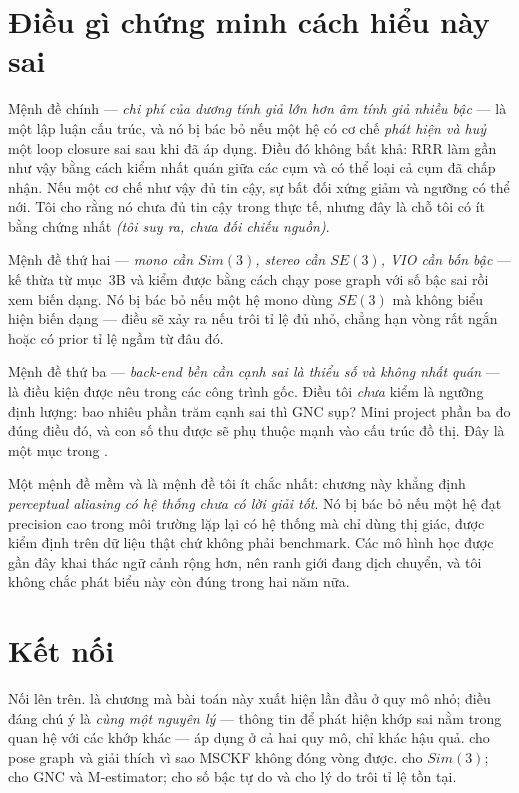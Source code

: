 \documentclass[../../vslam.tex]{subfiles}
\begin{document}
\section{Điều gì chứng minh cách hiểu này sai}

Mệnh đề chính --- \emph{chi phí của dương tính giả lớn hơn âm tính giả nhiều bậc} --- là một lập luận cấu trúc, và nó bị bác bỏ nếu một hệ có cơ chế \emph{phát hiện và huỷ} một loop closure sai sau khi đã áp dụng. Điều đó không bất khả: RRR \cite{latif2013rrr} làm gần như vậy bằng cách kiểm nhất quán giữa các cụm và có thể loại cả cụm đã chấp nhận. Nếu một cơ chế như vậy đủ tin cậy, sự bất đối xứng giảm và ngưỡng có thể nới. Tôi cho rằng nó chưa đủ tin cậy trong thực tế, nhưng đây là chỗ tôi có ít bằng chứng nhất \emph{(tôi suy ra, chưa đối chiếu nguồn)}.

Mệnh đề thứ hai --- \emph{mono cần \(Sim(3)\), stereo cần \(SE(3)\), VIO cần bốn bậc} --- kế thừa từ  mục~3B và kiểm được bằng cách chạy pose graph với số bậc sai rồi xem biến dạng. Nó bị bác bỏ nếu một hệ mono dùng \(SE(3)\) mà không biểu hiện biến dạng --- điều sẽ xảy ra nếu trôi tỉ lệ đủ nhỏ, chẳng hạn vòng rất ngắn hoặc có prior tỉ lệ ngầm từ đâu đó.

Mệnh đề thứ ba --- \emph{back-end bền cần cạnh sai là thiểu số và không nhất quán} --- là điều kiện được nêu trong các công trình gốc. Điều tôi \emph{chưa} kiểm là ngưỡng định lượng: bao nhiêu phần trăm cạnh sai thì GNC sụp? Mini project phần ba đo đúng điều đó, và con số thu được sẽ phụ thuộc mạnh vào cấu trúc đồ thị. Đây là một mục trong .

Một mệnh đề mềm và là mệnh đề tôi ít chắc nhất: chương này khẳng định \emph{perceptual aliasing có hệ thống chưa có lời giải tốt}. Nó bị bác bỏ nếu một hệ đạt precision cao trong môi trường lặp lại có hệ thống mà chỉ dùng thị giác, được kiểm định trên dữ liệu thật chứ không phải benchmark. Các mô hình học được gần đây khai thác ngữ cảnh rộng hơn, nên ranh giới đang dịch chuyển, và tôi không chắc phát biểu này còn đúng trong hai năm nữa.

\section{Kết nối}

Nối lên trên.  là chương mà bài toán này xuất hiện lần đầu ở quy mô nhỏ; điều đáng chú ý là \emph{cùng một nguyên lý} --- thông tin để phát hiện khớp sai nằm trong quan hệ với các khớp khác --- áp dụng ở cả hai quy mô, chỉ khác hậu quả.  cho pose graph và giải thích vì sao MSCKF không đóng vòng được.  cho \(Sim(3)\);  cho GNC và M-estimator;  cho số bậc tự do và cho lý do trôi tỉ lệ tồn tại.
\end{document}
